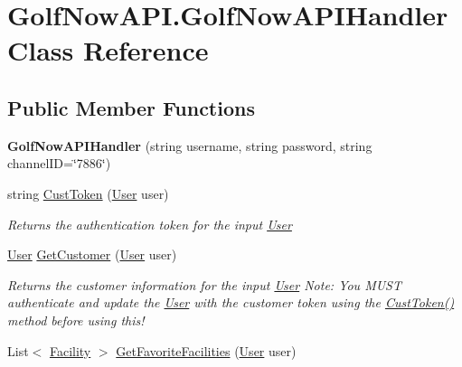\hypertarget{class_golf_now_a_p_i_1_1_golf_now_a_p_i_handler}{}\section{Golf\+Now\+A\+P\+I.\+Golf\+Now\+A\+P\+I\+Handler Class Reference}
\label{class_golf_now_a_p_i_1_1_golf_now_a_p_i_handler}
\subsection*{Public Member Functions}
\begin{DoxyCompactItemize}
\item 
\mbox{\label{class_golf_now_a_p_i_1_1_golf_now_a_p_i_handler_a88d9644187d4f2eaf4b3a7f923a4f0ce}} 
{\bfseries Golf\+Now\+A\+P\+I\+Handler} (string username, string password, string channel\+ID=\char`\"{}7886\char`\"{})
\item 
string \mbox{\hyperlink{class_golf_now_a_p_i_1_1_golf_now_a_p_i_handler_a8ba0b542b68c1e48166b59c6d6b167fd}{Cust\+Token}} (\mbox{\hyperlink{class_golf_now_a_p_i_1_1_user}{User}} user)
\begin{DoxyCompactList}\small\item\em Returns the authentication token for the input \mbox{\hyperlink{class_golf_now_a_p_i_1_1_user}{User}} \end{DoxyCompactList}\item 
\mbox{\hyperlink{class_golf_now_a_p_i_1_1_user}{User}} \mbox{\hyperlink{class_golf_now_a_p_i_1_1_golf_now_a_p_i_handler_a8a358e41a9bc610ea0b95aeeb6d046b0}{Get\+Customer}} (\mbox{\hyperlink{class_golf_now_a_p_i_1_1_user}{User}} user)
\begin{DoxyCompactList}\small\item\em Returns the customer information for the input \mbox{\hyperlink{class_golf_now_a_p_i_1_1_user}{User}} Note\+: You M\+U\+ST authenticate and update the \mbox{\hyperlink{class_golf_now_a_p_i_1_1_user}{User}} with the customer token using the \mbox{\hyperlink{class_golf_now_a_p_i_1_1_golf_now_a_p_i_handler_a8ba0b542b68c1e48166b59c6d6b167fd}{Cust\+Token()}} method before using this! \end{DoxyCompactList}\item 
List$<$ \mbox{\hyperlink{class_golf_now_a_p_i_1_1_facility}{Facility}} $>$ \mbox{\hyperlink{class_golf_now_a_p_i_1_1_golf_now_a_p_i_handler_a9e139fbfbe2136b94d26c1c87d8a737b}{Get\+Favorite\+Facilities}} (\mbox{\hyperlink{class_golf_now_a_p_i_1_1_user}{User}} user)

\end{DoxyCompactItemize}
